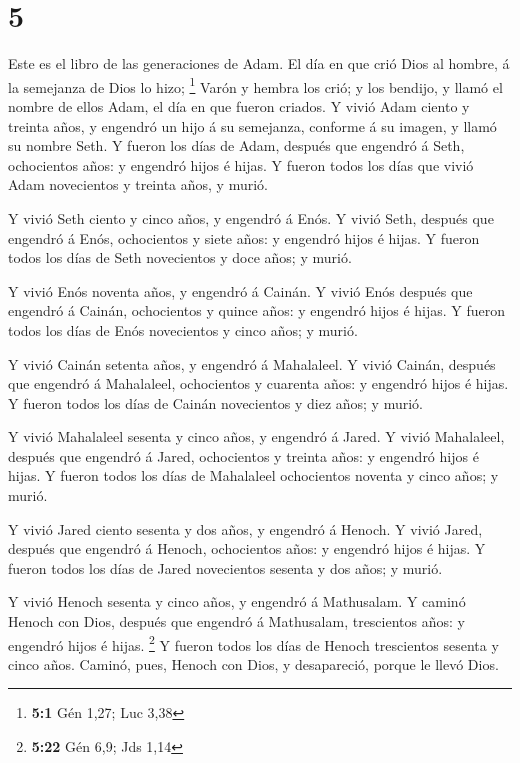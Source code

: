 \hypertarget{section-4}{%
\section{5}\label{section-4}}

 Este es el libro de las generaciones de Adam. El día en
que crió Dios al hombre, á la semejanza de Dios lo hizo; \footnote{\textbf{5:1}
  Gén 1,27; Luc 3,38}  Varón y hembra los crió; y los
bendijo, y llamó el nombre de ellos Adam, el día en que fueron criados.
 Y vivió Adam ciento y treinta años, y engendró un hijo á
su semejanza, conforme á su imagen, y llamó su nombre Seth.
 Y fueron los días de Adam, después que engendró á Seth,
ochocientos años: y engendró hijos é hijas.  Y fueron
todos los días que vivió Adam novecientos y treinta años, y murió.

 Y vivió Seth ciento y cinco años, y engendró á Enós.
 Y vivió Seth, después que engendró á Enós, ochocientos y
siete años: y engendró hijos é hijas.  Y fueron todos los
días de Seth novecientos y doce años; y murió.

 Y vivió Enós noventa años, y engendró á Cainán.
 Y vivió Enós después que engendró á Cainán, ochocientos
y quince años: y engendró hijos é hijas.  Y fueron todos
los días de Enós novecientos y cinco años; y murió.

 Y vivió Cainán setenta años, y engendró á Mahalaleel.
 Y vivió Cainán, después que engendró á Mahalaleel,
ochocientos y cuarenta años: y engendró hijos é hijas.  Y
fueron todos los días de Cainán novecientos y diez años; y murió.

 Y vivió Mahalaleel sesenta y cinco años, y engendró á
Jared.  Y vivió Mahalaleel, después que engendró á Jared,
ochocientos y treinta años: y engendró hijos é hijas.  Y
fueron todos los días de Mahalaleel ochocientos noventa y cinco años; y
murió.

 Y vivió Jared ciento sesenta y dos años, y engendró á
Henoch.  Y vivió Jared, después que engendró á Henoch,
ochocientos años: y engendró hijos é hijas.  Y fueron
todos los días de Jared novecientos sesenta y dos años; y murió.

 Y vivió Henoch sesenta y cinco años, y engendró á
Mathusalam.  Y caminó Henoch con Dios, después que
engendró á Mathusalam, trescientos años: y engendró hijos é hijas.
\footnote{\textbf{5:22} Gén 6,9; Jds 1,14}  Y fueron
todos los días de Henoch trescientos sesenta y cinco años.
 Caminó, pues, Henoch con Dios, y desapareció, porque le
llevó Dios.

